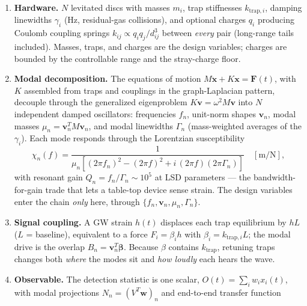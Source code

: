 \documentclass[11pt, letterpaper]{article}
\begin{document}
\begin{enumerate}[noitemsep]
  \item \textbf{Hardware.}  $N$ levitated discs with masses $m_i$, trap
        stiffnesses $k_{\mathrm{trap},i}$, damping linewidths $\gamma_i$
        (Hz, residual-gas collisions), and optional charges $q_i$
        producing Coulomb coupling springs
        $k_{ij} \propto q_i q_j / d_{ij}^3$ between \emph{every} pair
        (long-range tails included).  Masses, traps, and charges are the
        design variables; charges are bounded by the controllable range
        and the stray-charge floor.
  \item \textbf{Modal decomposition.}  The equations of motion
        $M\ddot{\mathbf{x}} + K\mathbf{x} = \mathbf{F}(t)$, with $K$
        assembled from traps and couplings in the graph-Laplacian
        pattern, decouple through the generalized eigenproblem
        $K\mathbf{v} = \omega^2 M \mathbf{v}$ into $N$ independent
        damped oscillators: frequencies $f_n$, unit-norm shapes
        $\mathbf{v}_n$, modal masses $\mu_n = \mathbf{v}_n^T M
        \mathbf{v}_n$, and modal linewidths $\Gamma_n$ (mass-weighted
        averages of the $\gamma_i$).  Each mode responds through the
        Lorentzian susceptibility
        \begin{equation}
          \chi_n(f) = \frac{1}{\mu_n\!\left[(2\pi f_n)^2 - (2\pi f)^2
            + i\,(2\pi f)(2\pi\Gamma_n)\right]}
          \quad [\mathrm{m/N}],
        \end{equation}
        with resonant gain $Q_n = f_n/\Gamma_n \sim 10^5$ at LSD
        parameters --- the bandwidth-for-gain trade that lets a
        table-top device sense strain.  The design variables enter the
        chain \emph{only} here, through $\{f_n, \mathbf{v}_n, \mu_n,
        \Gamma_n\}$.
  \item \textbf{Signal coupling.}  A GW strain $h(t)$ displaces each
        trap equilibrium by $hL$ ($L$ = baseline), equivalent to a force
        $F_i = \beta_i h$ with $\beta_i = k_{\mathrm{trap},i} L$; the
        modal drive is the overlap $B_n = \mathbf{v}_n^T
        \boldsymbol{\beta}$.  Because $\beta$ contains
        $k_{\mathrm{trap}}$, retuning traps changes both \emph{where}
        the modes sit and \emph{how loudly} each hears the wave.
  \item \textbf{Observable.}  The detection statistic is one scalar,
        $O(t) = \sum_i w_i x_i(t)$, with modal projections
        $N_n = (V^T\mathbf{w})_n$ and end-to-end transfer function
        \begin{equation}

\end{equation}
\end{enumerate}
\end{document}

